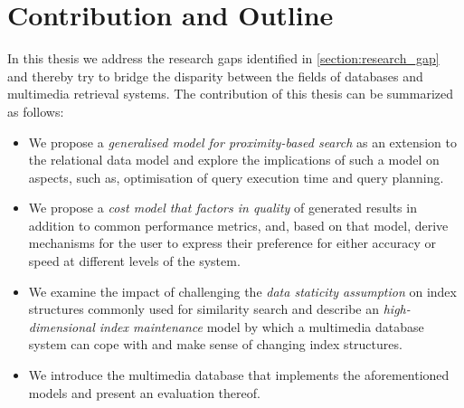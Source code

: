


\section{Contribution and Outline}
\label{section:contributions}

In this thesis we address the research gaps identified in \cref{section:research_gap} and thereby try to bridge the disparity between the fields of databases and multimedia retrieval systems. The contribution of this thesis can be summarized as follows:

\begin{itemize}
    \item We propose a \emph{generalised model for proximity-based search} as an extension to the relational data model and explore the implications of such a model on aspects, such as, optimisation of query execution time and query planning.
    \item We propose a \emph{cost model that factors in quality} of generated results in addition to common performance metrics, and, based on that model, derive mechanisms for the user to express their preference for either accuracy or speed at different levels of the system.
    \item We examine the impact of challenging the \emph{data staticity assumption} on index structures commonly used for similarity search and describe an \emph{high-dimensional index maintenance} model by which a multimedia database system can cope with and make sense of changing index structures.
    \item We introduce the multimedia database \cottontail{} \cite{Gasser:2020Cottontail} that implements the aforementioned models and present an evaluation thereof.
\end{itemize}

